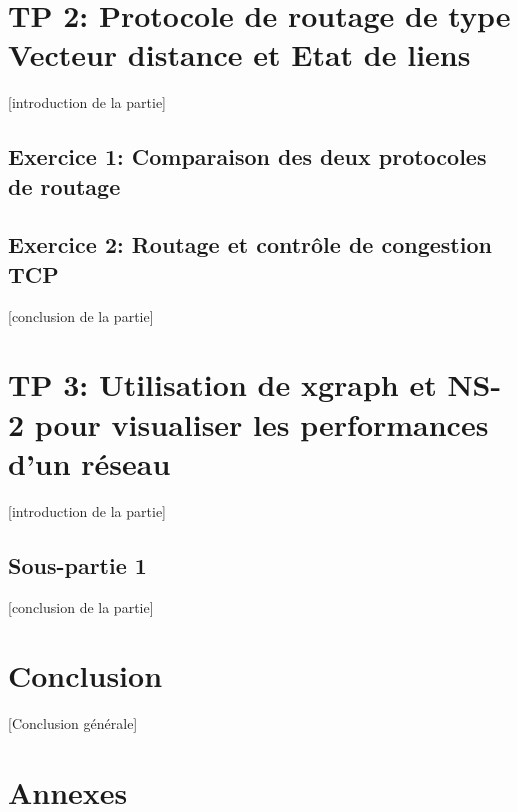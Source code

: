 \documentclass[11pt]{article}
\begin{document}
\pagebreak
\section{TP 2: Protocole de routage de type Vecteur distance et Etat de liens}
[introduction de la partie]

\subsection{Exercice 1: Comparaison des deux protocoles de routage}


\subsection{Exercice 2: Routage et contrôle de congestion TCP}

[conclusion de la partie]





\pagebreak
\section{TP 3: Utilisation de xgraph et NS-2 pour visualiser les performances d'un réseau}
[introduction de la partie]

\subsection{Sous-partie 1}

[conclusion de la partie]




\pagebreak
\section*{Conclusion}
[Conclusion générale]


\pagebreak
\section*{Annexes}
\end{document}
